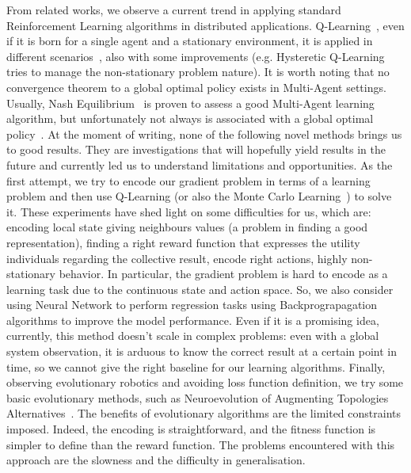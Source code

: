 \documentclass[conference]{IEEEtran}
\begin{document}
From related works, we observe a current trend in applying standard Reinforcement Learning algorithms in distributed applications.
Q-Learning~\cite{DBLP:journals/ras/Krose95}, even if it is born for a single agent and a stationary environment, it is applied in different scenarios~\cite{DBLP:conf/mass/ShahK07}, also with some improvements (e.g. Hysteretic Q-Learning~\cite{DBLP:conf/iros/MatignonLF07} tries to manage the non-stationary problem nature).
It is worth noting that no convergence theorem to a global optimal policy exists in Multi-Agent settings. 
Usually, Nash Equilibrium~\cite{DBLP:conf/icml/HuW98} is proven to assess a good Multi-Agent learning algorithm, but unfortunately not always is associated with a global optimal policy~\cite{DBLP:conf/uai/PeshkinKMK00}.
%
At the moment of writing, none of the following novel methods brings us to good results. They are investigations that will hopefully yield results in the future and currently led us to understand limitations and opportunities.
%
As the first attempt, we try to encode our gradient problem in terms of a learning problem and then use Q-Learning (or also the Monte Carlo Learning~\cite{DBLP:conf/nips/Thrun99}) to solve it.
These experiments have shed light on some difficulties for us, which are: encoding local state giving neighbours values (a problem in finding a good representation), finding a right reward function that expresses the utility individuals
regarding the collective result, encode right actions, highly non-stationary behavior. 
%
In particular, the gradient problem is hard to encode as a learning task due to the continuous state and action space.
So, we also consider using Neural Network to perform regression tasks using Backprograpagation algorithms to
improve the model performance. 
Even if it is a promising idea, currently, this method doesn't scale in complex problems: even with a global system observation, it is arduous to know the correct result at a certain point in time, so 
we cannot give the right baseline for our learning algorithms.
%
Finally, observing evolutionary robotics and avoiding loss function definition, we try some basic evolutionary methods, such as Neuroevolution of Augmenting Topologies Alternatives~\cite{DBLP:journals/ec/StanleyM02}.
The benefits of evolutionary algorithms are the limited constraints imposed. Indeed, the encoding is straightforward, and the fitness function is simpler to define than the reward function.
The problems encountered with this approach are the slowness and the difficulty in generalisation.
%
\end{document}
